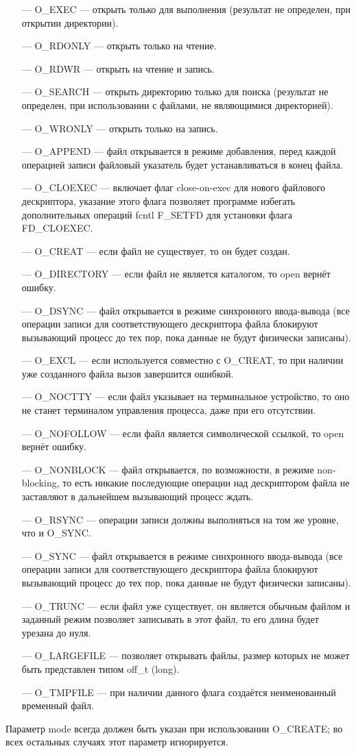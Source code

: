 \begin{itemize}
    \item[---] O\_EXEC --- открыть только для выполнения (результат не определен, при открытии директории).
    \item[---] O\_RDONLY --- открыть только на чтение.
    \item[---] O\_RDWR --- открыть на чтение и запись.
    \item[---] O\_SEARCH --- открыть директорию только для поиска (результат не определен, при использовании с файлами, не являющимися директорией).
    \item[---] O\_WRONLY --- открыть только на запись.
    \item[---] O\_APPEND --- файл открывается в режиме добавления, перед каждой операцией записи файловый указатель будет устанавливаться в конец файла.
    \item[---] O\_CLOEXEC --- включает флаг close-on-exec для нового файлового дескриптора, указание этого флага позволяет программе избегать дополнительных операций fcntl F\_SETFD для установки флага FD\_CLOEXEC.
    \item[---] O\_CREAT --- если файл не существует, то он будет создан.
    \item[---] O\_DIRECTORY --- если файл не является каталогом, то open вернёт ошибку.
    \item[---] O\_DSYNC --- файл открывается в режиме синхронного ввода-вывода (все операции записи для соответствующего дескриптора файла блокируют вызывающий процесс до тех пор, пока данные не будут физически записаны).
    \item[---] O\_EXCL --- если используется совместно с O\_CREAT, то при наличии уже созданного файла вызов завершится ошибкой.
    \item[---] O\_NOCTTY --- если файл указывает на терминальное устройство, то оно не станет терминалом управления процесса, даже при его отсутствии.
    \item[---] O\_NOFOLLOW --- если файл является символической ссылкой, то open вернёт ошибку.
    \item[---] O\_NONBLOCK --- файл открывается, по возможности, в режиме non-blocking,
то есть никакие последующие операции над дескриптором файла не заставляют в дальнейшем вызывающий процесс ждать.
    \item[---] O\_RSYNC --- операции записи должны выполняться на том же уровне, что и O\_SYNC.
    \item[---] O\_SYNC --- файл открывается в режиме синхронного ввода-вывода (все операции записи для соответствующего дескриптора файла блокируют вызывающий процесс до тех пор, пока данные не будут физически записаны).
    \item[---] O\_TRUNC --- если файл уже существует, он является обычным файлом и заданный режим позволяет записывать в этот файл, то его длина будет урезана до нуля.
    \item[---] O\_LARGEFILE --- позволяет открывать файлы, размер которых не может быть представлен типом off\_t (long).
    \item[---] O\_TMPFILE --- при наличии данного флага создаётся неименованный временный файл.
\end{itemize}

Параметр mode всегда должен быть указан при использовании O\_CREATE; во всех остальных случаях этот параметр игнорируется.

